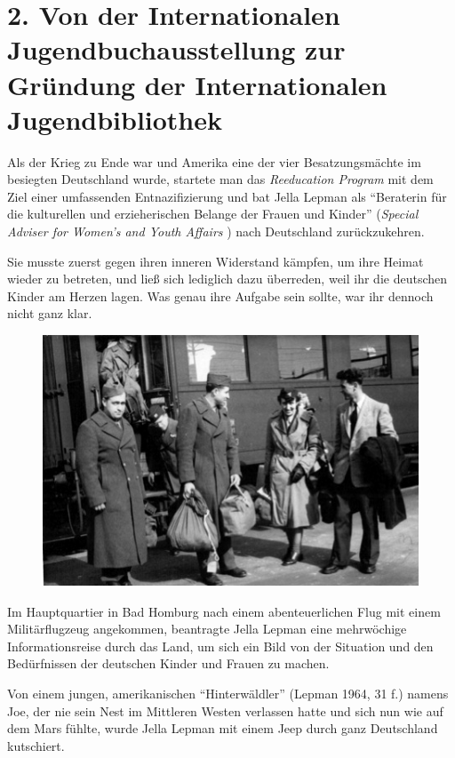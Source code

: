 \documentclass[a4paper,
fontsize=11pt,
oneside,
numbers=noperiodatend,
parskip=half-,
bibliography=totoc,
final
]{scrartcl}
\begin{document}
\section*{2. Von der Internationalen Jugendbuchausstellung zur
Gründung der Internationalen
Jugendbibliothek}\label{von-der-internationalen-jugendbuchausstellung-zur-gruxfcndung-der-internationalen-jugendbibliothek}

Als der Krieg zu Ende war und Amerika eine der vier Besatzungsmächte im
besiegten Deutschland wurde, startete man das \emph{Reeducation Program}
mit dem Ziel einer umfassenden Entnazifizierung und bat Jella Lepman als
\enquote{Beraterin für die kulturellen und erzieherischen Belange der
Frauen und Kinder} (\emph{Special Adviser for Women's and Youth Affairs}
) nach Deutschland zurückzukehren.

Sie musste zuerst gegen ihren inneren Widerstand kämpfen, um ihre Heimat
wieder zu betreten, und ließ sich lediglich dazu überreden, weil ihr die
deutschen Kinder am Herzen lagen. Was genau ihre Aufgabe sein sollte,
war ihr dennoch nicht ganz klar.

\begin{figure}[htbp]
\centering
\includegraphics{img/bild2.jpg}
\end{figure}

Im Hauptquartier in Bad Homburg nach einem abenteuerlichen Flug mit
einem Militärflugzeug angekommen, beantragte Jella Lepman eine
mehrwöchige Informationsreise durch das Land, um sich ein Bild von der
Situation und den Bedürfnissen der deutschen Kinder und Frauen zu
machen.

Von einem jungen, amerikanischen \enquote{Hinterwäldler} (Lepman 1964,
31 f.) namens Joe, der nie sein Nest im Mittleren Westen verlassen hatte
und sich nun wie auf dem Mars fühlte, wurde Jella Lepman mit einem Jeep
durch ganz Deutschland kutschiert.~
\end{document}
